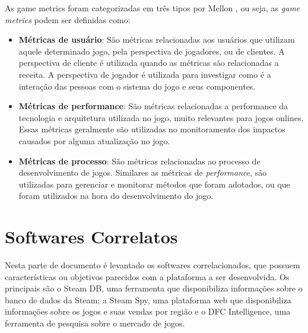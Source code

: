 As game metrics foram categorizadas em três tipos por Mellon \cite{game_metrics}, ou seja, as \textit{game metrics} podem ser definidas como:
\begin{itemize}
	\item \textbf{Métricas de usuário}: São métricas relacionadas aos usuários que utilizam aquele determinado jogo, pela perspectiva de jogadores, ou de clientes. A perspectiva de cliente é utilizada quando as métricas são relacionadas a receita. A perspectiva de jogador é utilizada para investigar como é a interação das pessoas com o sistema do jogo e seus componentes.
	\item \textbf{Métricas de performance}: São métricas relacionadas a performance da tecnologia e arquitetura utilizada no jogo, muito relevantes para jogos onlines. Essas métricas geralmente são utilizadas no monitoramento dos impactos causados por alguma atualização no jogo.
	\item \textbf{Métricas de processo}: São métricas relacionadas ao processo de desenvolvimento de jogos. Similares as métricas de \textit{performance}, são utilizadas para gerenciar e monitorar métodos que foram adotados, ou que foram utilizados na hora do desenvolvimento do jogo. 
\end{itemize}
\section{Softwares Correlatos}
Nesta parte de documento é levantado os softwares correlacionados, que possuem características ou objetivos parecidos com a plataforma a ser desenvolvida. Os principais são o Steam DB, uma ferramenta que disponibiliza informações sobre o banco de dados da Steam; a Steam Spy, uma plataforma web que disponibiliza informações sobre os jogos e suas vendas por região e o DFC Intelligence, uma ferramenta de pesquisa sobre o mercado de jogos.
